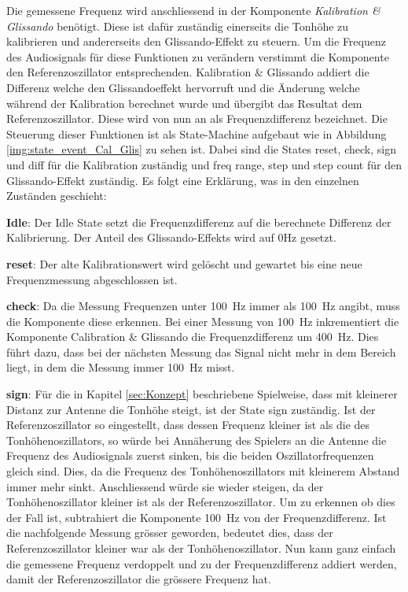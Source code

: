 Die gemessene Frequenz wird anschliessend in der Komponente \textit{Kalibration \& Glissando} benötigt. Diese ist dafür zuständig einerseits die Tonhöhe zu kalibrieren und andererseits den Glissando-Effekt zu steuern. Um die Frequenz des Audiosignals für diese Funktionen zu verändern verstimmt die Komponente den Referenzoszillator entsprechenden. Kalibration \& Glissando addiert die Differenz welche den Glissandoeffekt hervorruft und die Änderung welche während der Kalibration berechnet wurde und übergibt das Resultat dem Referenzoszillator. Diese wird von nun an als Frequenzdifferenz bezeichnet. Die Steuerung dieser Funktionen ist als State-Machine aufgebaut wie in Abbildung \ref{img:state_event_Cal_Glis} zu sehen ist. 
Dabei sind die States reset, check, sign und diff für die Kalibration zuständig und freq range, step und step count für den Glissando-Effekt zuständig. Es folgt eine Erklärung, was in den einzelnen Zuständen geschieht:

\textbf{Idle}:
Der Idle State setzt die Frequenzdifferenz auf die berechnete Differenz der Kalibrierung. Der Anteil des Glissando-Effekts wird auf 0Hz gesetzt.

\textbf{reset}:
Der alte Kalibrationswert wird gelöscht und gewartet bis eine neue Frequenzmessung abgeschlossen ist.

\textbf{check}:
Da die Messung Frequenzen unter \SI{100}{Hz} immer als \SI{100}{Hz} angibt, muss die Komponente diese erkennen. Bei einer Messung von \SI{100}{Hz} inkrementiert die Komponente Calibration \& Glissando die Frequenzdifferenz um \SI{400}{Hz}. Dies führt dazu, dass bei der nächsten Messung das Signal nicht mehr in dem Bereich liegt, in dem die Messung immer \SI{100}{Hz} misst.

\textbf{sign}:
Für die in Kapitel \ref{sec:Konzept} beschriebene Spielweise, dass mit kleinerer Distanz zur Antenne die Tonhöhe steigt, ist der State sign zuständig. Ist der Referenzoszillator so eingestellt, dass dessen Frequenz kleiner ist als die des Tonhöhenoszillators, so würde bei Annäherung des Spielers an die Antenne die Frequenz des Audiosignals zuerst sinken, bis die beiden Oszillatorfrequenzen gleich sind. Dies, da die Frequenz des Tonhöhenoszillators mit kleinerem Abstand immer mehr sinkt. Anschliessend würde sie wieder steigen, da der Tonhöhenoszillator kleiner ist als der Referenzoszillator. Um zu erkennen ob dies der Fall ist, subtrahiert die Komponente \SI{100}{Hz} von der Frequenzdifferenz. Ist die nachfolgende Messung grösser geworden, bedeutet dies, dass der Referenzoszillator kleiner war als der Tonhöhenoszillator. Nun kann ganz einfach die gemessene Frequenz verdoppelt und zu der Frequenzdifferenz addiert werden, damit der Referenzoszillator die grössere Frequenz hat.

